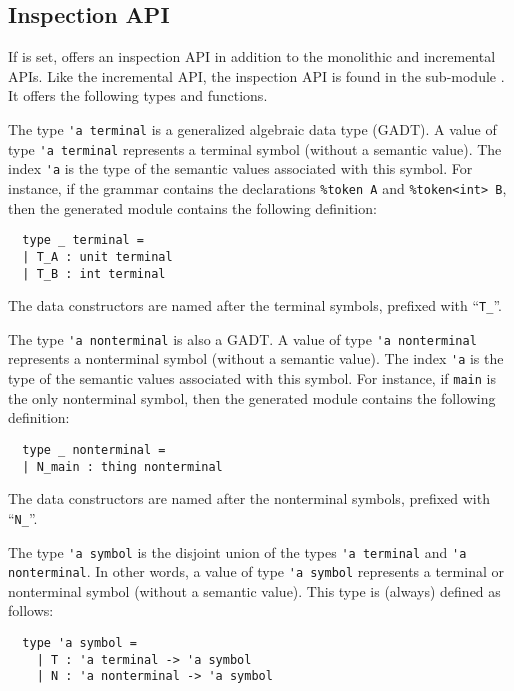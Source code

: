\documentclass[onecolumn,11pt,nocopyrightspace,preprint]{sigplanconf}
\begin{document}

\subsection{Inspection API}
\label{sec:inspection}

If \oinspection is set, \menhir offers an inspection API in addition to the
monolithic and incremental APIs. Like the incremental API, the inspection API
is found in the sub-module \menhirinterpreter. It offers the following types
and functions.


The type \verb+'a terminal+ is a generalized algebraic data type (GADT). A
value of type \verb+'a terminal+ represents a terminal symbol (without a
semantic value). The index \verb+'a+ is the type of the semantic values
associated with this symbol. For instance, if the grammar contains the
declarations \verb+%token A+ and \verb+%token<int> B+, then the generated
module \menhirinterpreter contains the following definition:
%
\begin{verbatim}
  type _ terminal =
  | T_A : unit terminal
  | T_B : int terminal
\end{verbatim}
%
The data constructors are named after the terminal symbols, prefixed with ``\verb+T_+''.


The type \verb+'a nonterminal+ is also a GADT. A value of type
\verb+'a nonterminal+ represents a nonterminal symbol (without a semantic value). The
index \verb+'a+ is the type of the semantic values associated with this
symbol. For instance, if \verb+main+ is the only nonterminal symbol,
then the generated
module \menhirinterpreter contains the following definition:
%
\begin{verbatim}
  type _ nonterminal =
  | N_main : thing nonterminal
\end{verbatim}
%
The data constructors are named after the nonterminal symbols, prefixed with ``\verb+N_+''.


The type \verb+'a symbol+
is the disjoint union of the types \verb+'a terminal+ and \verb+'a nonterminal+.
In other words, a value of type \verb+'a symbol+ represents a terminal or nonterminal symbol (without
a semantic value).
This type is (always) defined as follows:
%
\begin{verbatim}
  type 'a symbol =
    | T : 'a terminal -> 'a symbol
    | N : 'a nonterminal -> 'a symbol
\end{verbatim}
\end{document}
